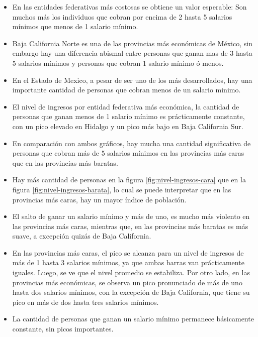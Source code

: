 \documentclass[
10pt, %
a4paper, %
oneside, %
headinclude,footinclude, %
BCOR5mm, %
]{scrartcl}
\begin{document}
    \begin{itemize}
            \item En las entidades federativas más costosas se obtiene un valor esperable: Son muchos más los individuos que cobran por encima de 2 hasta 5 salarios mínimos que menos de 1 salario mínimo.
            \item Baja California Norte es una de las provincias más económicas de México, sin embargo hay una diferencia abismal entre personas que ganan mas de 3 hasta 5 salarios mínimos y personas que cobran 1 salario mínimo ó menos.
            \item En el Estado de Mexico, a pesar de ser uno de los más desarrollados, hay una importante cantidad de personas que cobran menos de un salario minimo.
            \item El nivel de ingresos por entidad federativa más económica, la cantidad de personas que ganan menos de 1 salario mínimo es prácticamente constante, con un pico elevado en Hidalgo y un pico más bajo en Baja California Sur.
            \item En comparación con ambos gráficos, hay mucha una cantidad significativa de personas que cobran más de 5 salarios mínimos en las provincias más caras que en las provincias más baratas.
            \item Hay más cantidad de personas en la figura \ref{fig:nivel-ingresos-cara} que en la figura \ref{fig:nivel-ingresos-barata}, lo cual se puede interpretar que en las provincias más caras, hay un mayor índice de población.
            \item El salto de ganar un salario mínimo y más de uno, es mucho más violento en las provincias más caras, mientras que, en las provincias más baratas es más suave, a excepción quizás de Baja California.
            \item En las provincias más caras, el pico se alcanza para un nivel de ingresos de más de 1 hasta 3 salarios mínimos, ya que ambas barras van prácticamente iguales. Luego, se ve que el nivel promedio se estabiliza.
            Por otro lado, en las provincias más económicas, se observa un pico pronunciado de más de uno hasta dos salarios mínimos, con la excepción de Baja California, que tiene su pico en más de dos hasta tres salarios mínimos. 
            \item La cantidad de personas que ganan un salario mínimo permanece básicamente constante, sin picos importantes.
            \end{itemize}
\end{document}
